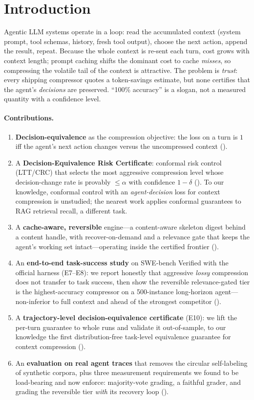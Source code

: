 \documentclass{article}
\begin{document}
\section{Introduction}
Agentic LLM systems operate in a loop: read the accumulated context (system prompt,
tool schemas, history, fresh tool output), choose the next action, append the
result, repeat. Because the whole context is re-sent each turn, cost grows with
context length; prompt caching shifts the dominant cost to cache \emph{misses}, so
compressing the volatile tail of the context is attractive. The problem is
\emph{trust}: every shipping compressor quotes a token-savings estimate, but none
certifies that the agent's \emph{decisions} are preserved. ``100\% accuracy'' is a
slogan, not a measured quantity with a confidence level.

\paragraph{Contributions.}
\begin{enumerate}
  \item \textbf{Decision-equivalence} as the compression objective: the loss on a
  turn is $1$ iff the agent's next action changes versus the uncompressed context
  ().
  \item A \textbf{Decision-Equivalence Risk Certificate}: conformal risk control
  (LTT/CRC) that selects the most aggressive compression level whose decision-change
  rate is provably $\le \alpha$ with confidence $1-\delta$ (). To
  our knowledge, conformal control with an \emph{agent-decision} loss for context
  compression is unstudied; the nearest work applies conformal guarantees to RAG
  retrieval recall, a different task.
  \item A \textbf{cache-aware, reversible} engine---a content-aware skeleton digest
  behind a content handle, with recover-on-demand and a relevance gate that keeps the
  agent's working set intact---operating inside the certified frontier ().
  \item An \textbf{end-to-end task-success study} on SWE-bench Verified with the official
  harness (E7--E8): we report honestly that aggressive \emph{lossy} compression does not
  transfer to task success, then show the reversible relevance-gated tier is the
  highest-accuracy compressor on a 500-instance long-horizon agent---non-inferior to full
  context and ahead of the strongest competitor ().
  \item A \textbf{trajectory-level decision-equivalence certificate} (E10): we lift the
  per-turn guarantee to whole runs and validate it out-of-sample, to our knowledge the first
  distribution-free task-level equivalence guarantee for context compression ().
  \item An \textbf{evaluation on real agent traces} that removes the circular
  self-labeling of synthetic corpora, plus three measurement requirements we found
  to be load-bearing and now enforce: majority-vote grading, a faithful grader, and
  grading the reversible tier \emph{with} its recovery loop ().
\end{enumerate}
\end{document}
